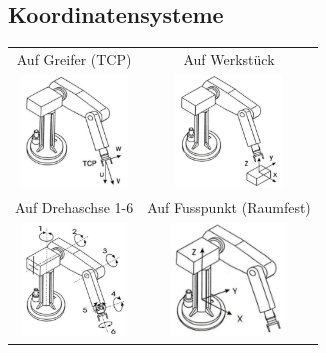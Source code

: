 \begin{minipage}{0.5\linewidth}
\subsection{Koordinatensysteme}
\begin{tabular}{|c|c|}
    \hline
    Auf Greifer (TCP) & Auf Werkstück\\
    \includegraphics[height=3cm]{./bilder/koordsys1a} & \includegraphics[height=3cm]{./bilder/koordsys1b}\\
    \hline
    Auf Drehaschse 1-6 & Auf Fusspunkt (Raumfest)\\
        \includegraphics[height=3cm]{./bilder/koordsys1c} & \includegraphics[height=3cm]{./bilder/koordsys1d}\\
    \hline
\end{tabular}
\end{minipage}
